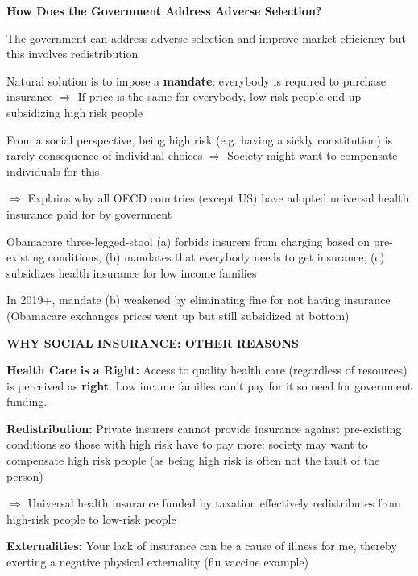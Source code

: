\documentclass[landscape]{slides}
\begin{document}
%

\begin{slide}
\begin{center}
{\bf How Does the Government Address Adverse Selection?}
\end{center}

The government can address adverse selection and improve market efficiency but this involves redistribution

Natural solution is to impose a \textbf{mandate}: everybody is required to
purchase insurance $\Rightarrow$ If price is the same for everybody, low risk people end up subsidizing high risk people

From a social perspective, being high risk (e.g. having a sickly constitution) is rarely consequence of
individual choices $\Rightarrow$ Society might want to compensate individuals for this

$\Rightarrow$ Explains why all OECD countries (except US) have adopted universal health insurance
paid for by government 

\small
Obamacare three-legged-stool (a) forbids insurers from charging based on pre-existing conditions, (b) mandates that everybody 
needs to get insurance, (c) subsidizes health insurance for low income families

In 2019+, mandate (b) weakened by eliminating fine for not having insurance (Obamacare exchanges prices went up but
still subsidized at bottom)

\end{slide}

\begin{slide}
\begin{center}
{\bf WHY SOCIAL INSURANCE: OTHER REASONS}
\end{center}

{\bf Health Care is a Right:} Access to quality health care (regardless of resources) is perceived as \textbf{right}.
Low income families can't pay for it so need for government funding.

{\bf Redistribution:}
Private insurers cannot provide insurance against pre-existing conditions so those with
high risk have to pay more: society may want to compensate high risk people (as being high risk
is often not the fault of the person)

$\Rightarrow$ Universal health insurance funded by taxation
effectively redistributes from high-risk people to low-risk people


{\bf Externalities:} Your lack of insurance can be a cause of illness for me, thereby exerting a negative physical externality
(flu vaccine example)



\end{slide}
\end{document}
